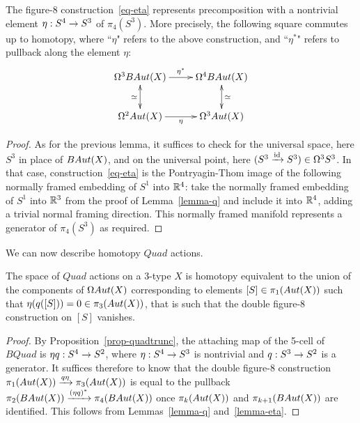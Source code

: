 \documentclass{amsart}
\begin{document}
\begin{lemma} \label{lemma-eta}
The figure-8 construction~\eqref{eq-eta} represents precomposition with a nontrivial element $\eta: S^4 \rightarrow S^3$ of $\pi_4(S^3)$.  More precisely, the following square commutes up to homotopy, where ``$\eta$" refers to the above construction, and ``$\eta^\ast$" refers to pullback along the element $\eta$:
\begin{equation} \nn
\xymatrix{
\Omega^3 B\Aut(X) \ar[r]^{\eta^\ast} \ar@{<->}[d]_{\simeq} & \Omega^4 B\Aut(X)  \ar@{<->}[d]^{\simeq} \\
\Omega^2 \Aut(X) \ar[r]_{\eta} & \Omega^3 \Aut(X)
}
\end{equation}
\end{lemma}

\begin{proof}
As for the previous lemma, it suffices to check for the universal space, here $S^3$ in place of $BAut(X)$, and on the universal point, here $(S^3 \xrightarrow{\mathrm{id}} S^3) \in \Omega^3 S^3$.  In that case, construction~\eqref{eq-eta} is the Pontryagin-Thom image of the following normally framed embedding of $S^1$ into $\mathbb R^4$: take the normally framed embedding of $S^1$ into $\mathbb R^3$ from the proof of Lemma~\ref{lemma-q} and include it into $\mathbb R^4$, adding a trivial normal framing direction.  This normally framed manifold represents a generator of $\pi_4(S^3)$ as required.
\end{proof}

We can now describe homotopy $Quad$ actions.

\begin{proposition} \label{prop-quadaction}
The space of $Quad$ actions on a 3-type $X$ is homotopy equivalent to the union of the components of $\Omega Aut(X)$ corresponding to elements $[S] \in \pi_1(Aut(X))$ such that $\eta(q([S])) = 0 \in \pi_3(Aut(X))$, that is such that the double figure-8 construction on $[S]$ vanishes.
\end{proposition}
\begin{proof}
By Proposition~\ref{prop-quadtrunc}, the attaching map of the 5-cell of $BQuad$ is $\eta q: S^4 \rightarrow S^2$, where $\eta : S^4 \rightarrow S^3$ is nontrivial and $q: S^3 \rightarrow S^2$ is a generator.  It suffices therefore to know that the double figure-8 construction $\pi_1(Aut(X)) \xrightarrow{q \eta} \pi_3(Aut(X))$ is equal to the pullback $\pi_2(BAut(X)) \xrightarrow{(\eta q)^\ast} \pi_4(BAut(X))$ once $\pi_{k}(Aut(X))$ and $\pi_{k+1}(BAut(X))$ are identified.  This follows from Lemmas~\ref{lemma-q} and~\ref{lemma-eta}.
\end{proof}
\end{document}
